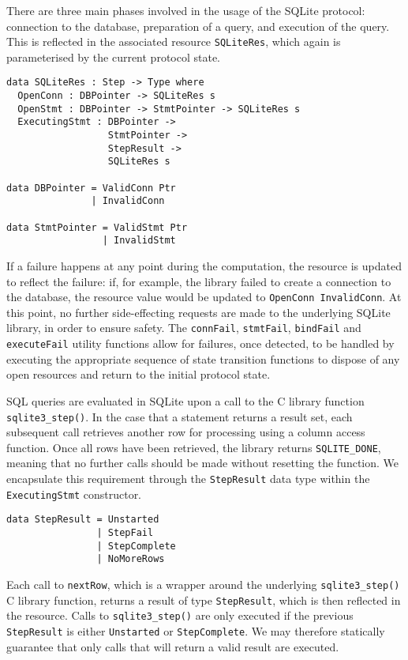 \documentclass[preprint]{sigplanconf}
\begin{document}
There are three main phases involved in the usage of the SQLite protocol: connection to the database, preparation of a query, and execution of the query. This is reflected in the associated resource \texttt{SQLiteRes}, which again is parameterised by the current protocol state.
\begin{Verbatim}
data SQLiteRes : Step -> Type where
  OpenConn : DBPointer -> SQLiteRes s
  OpenStmt : DBPointer -> StmtPointer -> SQLiteRes s
  ExecutingStmt : DBPointer -> 
                  StmtPointer -> 
                  StepResult -> 
                  SQLiteRes s
                  
data DBPointer = ValidConn Ptr
               | InvalidConn

data StmtPointer = ValidStmt Ptr
                 | InvalidStmt 
\end{Verbatim}
If a failure happens at any point during the computation, the resource is updated to reflect the failure: if, for example, the library failed to create a connection to the database, the resource value would be updated to \texttt{OpenConn InvalidConn}. At this point, no further side-effecting requests are made to the underlying SQLite library, in order to ensure safety. The \texttt{connFail}, \texttt{stmtFail}, \texttt{bindFail} and \texttt{executeFail} utility functions allow for failures, once detected, to be handled by executing the appropriate sequence of state transition functions to dispose of any open resources and return to the initial protocol state. 

SQL queries are evaluated in SQLite upon a call to the C library function \texttt{sqlite3\_step()}. In the case that a statement returns a result set, each subsequent call retrieves another row for processing using a column access function. Once all rows have been retrieved, the library returns \texttt{SQLITE\_DONE}, meaning that no further calls should be made without resetting the function. We encapsulate this requirement through the \texttt{StepResult} data type within the \texttt{ExecutingStmt} constructor. 
\begin{Verbatim}
data StepResult = Unstarted
                | StepFail
                | StepComplete
                | NoMoreRows
\end{Verbatim}
Each call to \texttt{nextRow}, which is a wrapper around the underlying \texttt{sqlite3\_step()} C library function, returns a result of type \texttt{StepResult}, which is then reflected in the resource. Calls to \texttt{sqlite3\_step()} are only executed if the previous \texttt{StepResult} is either \texttt{Unstarted} or \texttt{StepComplete}. We may therefore statically guarantee that only calls that will return a valid result are executed. 
\end{document}
